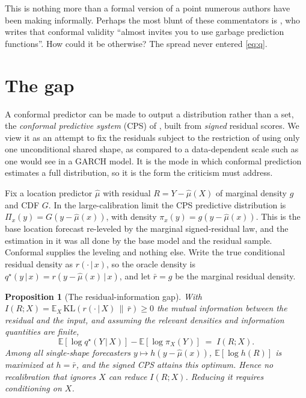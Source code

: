 \documentclass[11pt]{article}
\newtheorem{proposition}{Proposition}
\theoremstyle{definition}
\newcommand{\E}{\mathbb{E}}
\newcommand{\KL}{\mathrm{KL}}
\newcommand{\given}{\,\vert\,}
\begin{document}
This is nothing more than a formal version of a point numerous authors have been making
informally. Perhaps the most blunt of these commentators is \citet{recht2024cover}, who
writes that conformal validity ``almost invites you to use garbage prediction functions''.
How could it be otherwise? The spread never entered \eqref{eq:q}.

\section{The gap}

A conformal predictor can be made to output a distribution rather than a set, the
\emph{conformal predictive system} (CPS) of \citet{vovk2019nonparametric}, built from
\emph{signed} residual scores. We view it as an attempt to fix the residuals subject to the
restriction of using only one unconditional shared shape, as compared to a data-dependent
scale such as one would see in a GARCH model. It is the mode in which conformal prediction
estimates a full distribution, so it is the form the criticism must address.

Fix a location predictor $\hat\mu$ with residual $R=Y-\hat\mu(X)$ of marginal density $g$
and CDF $G$. In the large-calibration limit the CPS predictive distribution is
$\Pi_x(y)=G(y-\hat\mu(x))$, with density $\pi_x(y)=g(y-\hat\mu(x))$. This is the base
location forecast re-leveled by the marginal signed-residual law, and the estimation in it
was all done by the base model and the residual sample. Conformal supplies the leveling and
nothing else. Write the true conditional residual density as $r(\cdot\given x)$, so the
oracle density is $q^\star(y\given x)=r(y-\hat\mu(x)\given x)$, and let $\bar r=g$ be the
marginal residual density.

\begin{proposition}[The residual-information gap]\label{prop:gap}
With $I(R;X)=\E_X\,\KL(r(\cdot\given X)\,\|\,\bar r)\ge 0$ the mutual information between
the residual and the input, and assuming the relevant densities and information quantities
are finite,
\begin{equation}\label{eq:gap}
  \E[\log q^\star(Y\given X)]-\E[\log \pi_X(Y)] \;=\; I(R;X).
\end{equation}
Among all single-shape forecasters $y\mapsto h(y-\hat\mu(x))$, $\E[\log h(R)]$ is maximized
at $h=\bar r$, and the signed CPS attains this optimum. Hence no recalibration that ignores
$X$ can reduce $I(R;X)$. Reducing it requires conditioning on $X$.
\end{proposition}
\end{document}
